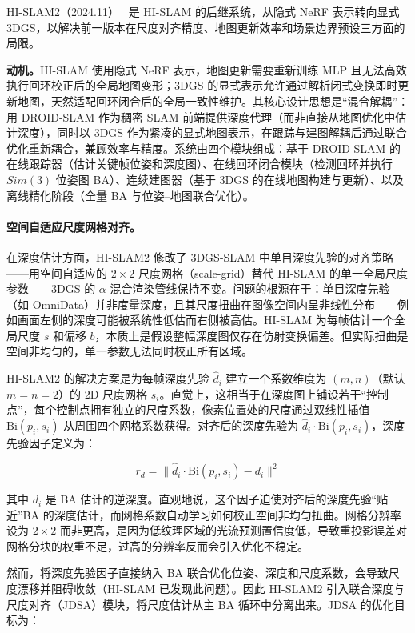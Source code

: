 HI-SLAM2（2024.11）~\cite{2411_17982} 是 HI-SLAM 的后继系统，从隐式 NeRF 表示转向显式 3DGS，以解决前一版本在尺度对齐精度、地图更新效率和场景边界预设三方面的局限。

\textbf{动机。}HI-SLAM 使用隐式 NeRF 表示，地图更新需要重新训练 MLP 且无法高效执行回环校正后的全局地图变形；3DGS 的显式表示允许通过解析闭式变换即时更新地图，天然适配回环闭合后的全局一致性维护。其核心设计思想是``混合解耦''：用 DROID-SLAM 作为稠密 SLAM 前端提供深度代理（而非直接从地图优化中估计深度），同时以 3DGS 作为紧凑的显式地图表示，在跟踪与建图解耦后通过联合优化重新耦合，兼顾效率与精度。系统由四个模块组成：基于 DROID-SLAM 的在线跟踪器（估计关键帧位姿和深度图）、在线回环闭合模块（检测回环并执行 $Sim(3)$ 位姿图 BA）、连续建图器（基于 3DGS 的在线地图构建与更新）、以及离线精化阶段（全量 BA 与位姿--地图联合优化）。

\paragraph{空间自适应尺度网格对齐。}
在深度估计方面，HI-SLAM2 修改了 3DGS-SLAM 中单目深度先验的对齐策略——用空间自适应的 $2{\times}2$ 尺度网格（scale-grid）替代 HI-SLAM 的单一全局尺度参数——3DGS 的 $\alpha$-混合渲染管线保持不变。问题的根源在于：单目深度先验（如 OmniData）并非度量深度，且其尺度扭曲在图像空间内呈非线性分布——例如画面左侧的深度可能被系统性低估而右侧被高估。HI-SLAM 为每帧估计一个全局尺度 $s$ 和偏移 $b$，本质上是假设整幅深度图仅存在仿射变换偏差。但实际扭曲是空间非均匀的，单一参数无法同时校正所有区域。

HI-SLAM2 的解决方案是为每帧深度先验 $\hat{d}_i$ 建立一个系数维度为 $(m,n)$（默认 $m{=}n{=}2$）的 2D 尺度网格 $s_i$。直觉上，这相当于在深度图上铺设若干``控制点''，每个控制点拥有独立的尺度系数，像素位置处的尺度通过双线性插值 $\mathrm{Bi}(p_i, s_i)$ 从周围四个网格系数获得。对齐后的深度先验为 $\hat{d}_i \cdot \mathrm{Bi}(p_i, s_i)$，深度先验因子定义为：

\begin{equation}
r_d = \| \hat{d}_i \cdot \mathrm{Bi}(p_i, s_i) - d_i \|^2
\end{equation}

其中 $d_i$ 是 BA 估计的逆深度。直观地说，这个因子迫使对齐后的深度先验``贴近''BA 的深度估计，而网格系数自动学习如何校正空间非均匀扭曲。网格分辨率设为 $2{\times}2$ 而非更高，是因为低纹理区域的光流预测置信度低，导致重投影误差对网格分块的权重不足，过高的分辨率反而会引入优化不稳定。

然而，将深度先验因子直接纳入 BA 联合优化位姿、深度和尺度系数，会导致尺度漂移并阻碍收敛（HI-SLAM 已发现此问题）。因此 HI-SLAM2 引入联合深度与尺度对齐（JDSA）模块，将尺度估计从主 BA 循环中分离出来。JDSA 的优化目标为：


